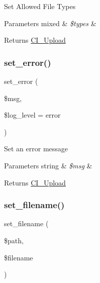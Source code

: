 Set Allowed File Types


\begin{DoxyParams}[1]{Parameters}
mixed & {\em \$types} & \\
\hline
\end{DoxyParams}
\begin{DoxyReturn}{Returns}
\mbox{\hyperlink{class_c_i___upload}{C\+I\+\_\+\+Upload}} 
\end{DoxyReturn}
\mbox{\label{class_c_i___upload_aab6e33df2ad916fc21e93a84b6fd48bf}} 
\subsubsection{\texorpdfstring{set\+\_\+error()}{set\_error()}}
{\footnotesize\ttfamily set\+\_\+error (\begin{DoxyParamCaption}\item[{}]{\$msg,  }\item[{}]{\$log\+\_\+level = {\ttfamily \textquotesingle{}error\textquotesingle{}} }\end{DoxyParamCaption})}

Set an error message


\begin{DoxyParams}[1]{Parameters}
string & {\em \$msg} & \\
\hline
\end{DoxyParams}
\begin{DoxyReturn}{Returns}
\mbox{\hyperlink{class_c_i___upload}{C\+I\+\_\+\+Upload}} 
\end{DoxyReturn}
\mbox{\label{class_c_i___upload_a4b09b3f2b57a8bafcac1700f43d12c36}} 
\subsubsection{\texorpdfstring{set\+\_\+filename()}{set\_filename()}}
{\footnotesize\ttfamily set\+\_\+filename (\begin{DoxyParamCaption}\item[{}]{\$path,  }\item[{}]{\$filename }\end{DoxyParamCaption})}

